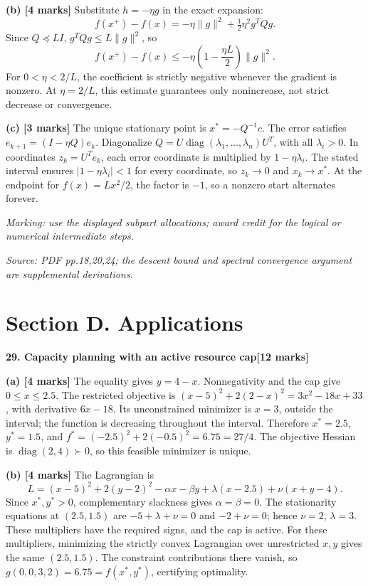 \documentclass[11pt,a4paper]{article}
\begin{document}
\textbf{(b) [4 marks]} Substitute \(h=-\eta g\) in the exact expansion: \[f(x^+)-f(x)=-\eta\|g\|^2+\tfrac12\eta^2g^TQg.\] Since \(Q\preceq LI\), \(g^TQg\le L\|g\|^2\), so \[f(x^+)-f(x)\le-\eta\left(1-\frac{\eta L}{2}\right)\|g\|^2.\] For \(0<\eta<2/L\), the coefficient is strictly negative whenever the gradient is nonzero. At \(\eta=2/L\), this estimate guarantees only nonincrease, not strict decrease or convergence.

\textbf{(c) [3 marks]} The unique stationary point is \(x^*=-Q^{-1}c\). The error satisfies \(e_{k+1}=(I-\eta Q)e_k\). Diagonalize \(Q=U\operatorname{diag}(\lambda_1,\ldots,\lambda_n)U^T\), with all \(\lambda_i>0\). In coordinates \(z_k=U^Te_k\), each error coordinate is multiplied by \(1-\eta\lambda_i\). The stated interval ensures \(|1-\eta\lambda_i|<1\) for every coordinate, so \(z_k\to0\) and \(x_k\to x^*\). At the endpoint for \(f(x)=Lx^2/2\), the factor is \(-1\), so a nonzero start alternates forever.

\textit{Marking: use the displayed subpart allocations; award credit for the logical or numerical intermediate steps.}\par
{\footnotesize\textit{Source: PDF pp.18,20,24; the descent bound and spectral convergence argument are supplemental derivations.}}
\newpage\section*{Section D. Applications}
\textbf{29. Capacity planning with an active resource cap}\hfill\textbf{[12 marks]}\par\medskip
\textbf{(a) [4 marks]} The equality gives \(y=4-x\). Nonnegativity and the cap give \(0\le x\le2.5\). The restricted objective is \((x-5)^2+2(2-x)^2=3x^2-18x+33\), with derivative \(6x-18\). Its unconstrained minimizer is \(x=3\), outside the interval; the function is decreasing throughout the interval. Therefore \(x^*=2.5\), \(y^*=1.5\), and \(f^*=(-2.5)^2+2(-0.5)^2=6.75=27/4\). The objective Hessian is \(\operatorname{diag}(2,4)\succ0\), so this feasible minimizer is unique.

\textbf{(b) [4 marks]} The Lagrangian is \[L=(x-5)^2+2(y-2)^2-\alpha x-\beta y+\lambda(x-2.5)+\nu(x+y-4).\] Since \(x^*,y^*>0\), complementary slackness gives \(\alpha=\beta=0\). The stationarity equations at \((2.5,1.5)\) are \(-5+\lambda+\nu=0\) and \(-2+\nu=0\); hence \(\nu=2\), \(\lambda=3\). These multipliers have the required signs, and the cap is active. For these multipliers, minimizing the strictly convex Lagrangian over unrestricted \(x,y\) gives the same \((2.5,1.5)\). The constraint contributions there vanish, so \(g(0,0,3,2)=6.75=f(x^*,y^*)\), certifying optimality.
\end{document}
